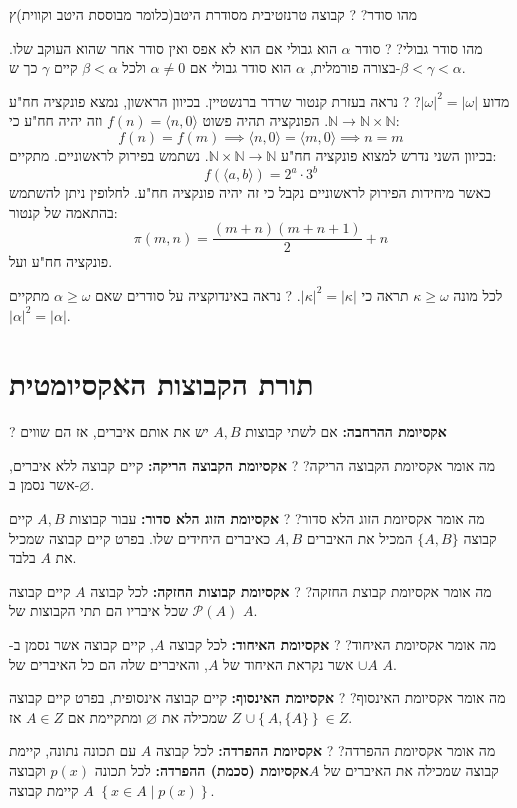 \documentclass{tstextbook}
\begin{document}
מהו סודר?
?
קבוצה טרנזטיבית מסודרת היטב(כלומר מבוססת היטב וקווית)ץ

מהו סודר גבולי?
?
סודר \(\alpha\) הוא גבולי אם הוא לא אפס ואין סודר אחר שהוא העוקב שלו. בצורה פורמלית, \(\alpha\) הוא סודר גבולי אם \(\alpha \neq 0\) ולכל \(\beta < \alpha\) קיים \(\gamma\) כך ש-\(\beta<\gamma<\alpha\).

מדוע \(|\omega|^{2}=|\omega|\)?
?
נראה בעזרת קנטור שרדר ברנשטיין. בכיוון הראשון, נמצא פונקציה חח"ע \(\mathbb{N}\to \mathbb{N} \times \mathbb{N}\). הפונקציה תהיה פשוט \(f(n)=\langle n,0 \rangle\) וזה יהיה חח"ע כי:
$$f(n)=f(m)\implies \langle n,0 \rangle =\langle m,0 \rangle \implies n=m$$
בכיוון השני נדרש למצוא פונקציה חח"ע \(\mathbb{N}\times \mathbb{N}\to \mathbb{N}\). נשתמש בפירוק לראשוניים. מתקיים:
$$f\left( \langle a,b \rangle  \right)=2^{a}\cdot 3^{b}$$
כאשר מיחידות הפירוק לראשוניים נקבל כי זה יהיה פונקציה חח"ע. לחלופין ניתן להשתמש בהתאמה של קנטור:
$$\pi(m,n)= \frac{(m+n)(m+n+1)}{2}+n$$
פונקציה חח"ע ועל.

לכל מונה \(\kappa \geq \omega\) תראה כי \(|\kappa|^2=|\kappa|\).
?
נראה באינדוקציה על סודרים שאם \(\alpha \geq \omega\) מתקיים \(|\alpha|^{2}=|\alpha|\).

\section{תורת הקבוצות האקסיומטית}

?
\textbf{אקסיומת ההרחבה:} אם לשתי קבוצות \(A,B\) יש את אותם איברים, אז הם שווים

מה אומר אקסיומת הקבוצה הריקה?
?
\textbf{אקסיומת הקבוצה הריקה:} קיים קבוצה ללא איברים, אשר נסמן ב-\(\varnothing\).

מה אומר אקסיומת הזוג הלא סדור?
?
\textbf{אקסיומת הזוג הלא סדור:} עבור קבוצות \(A,B\) קיים קבוצה \(\{ A,B \}\) המכיל את האיברים \(A,B\) כאיברים היחידים שלו. בפרט קיים קבוצה שמכיל את \(A\) בלבד.

מה אומר אקסיומת קבוצת החזקה?
?
\textbf{אקסיומת קבוצות החזקה:} לכל קבוצה \(A\) קיים קבוצה \(\mathcal{P}(A)\) שכל איבריו הם תתי הקבוצות של \(A\).

מה אומר אקסיומת האיחוד?
?
\textbf{אקסיומת האיחוד:} לכל קבוצה \(A\), קיים קבוצה אשר נסמן ב-\(\cup A\) אשר נקראת האיחוד של \(A\), והאיברים שלה הם כל האיברים של \(A\).

מה אומר אקסיומת האינסוף?
?
\textbf{אקסיומת האינסוף:} קיים קבוצה אינסופית, בפרט קיים קבוצה \(Z\) שמכילה את \(\varnothing\) ומתקיימת אם \(A \in Z\) אז \(\cup \left\{  A,\{ A \}  \right\}\in Z\).

מה אומר אקסיומת ההפרדה?
?
\textbf{אקסיומת ההפרדה:} לכל קבוצה \(A\) עם תכונה נתונה, קיימת קבוצה שמכילה את האיברים של \(A\)\textbf{אקסיומת (סכמת) ההפרדה:} לכל תכונה \(p(x)\) וקבוצה \(A\) קיימת קבוצה \(\left\{  x \in A \mid p(x)  \right\}\).
\end{document}
